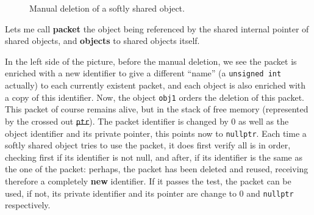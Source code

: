\documentclass{article}
\begin{document}
\begin{figure}[h!]
\begin{center}
  \end{center}

  \caption{Manual deletion of a softly shared object.}
  \label{fig:deletion}
\end{figure}

Lets me call \textbf{packet} the object being referenced by the shared internal
pointer of shared objects, and \textbf{objects} to shared objects itself.

In the left side of the picture, before the manual deletion, we see the packet
is enriched with a new identifier to give a different ``name'' (a
\texttt{unsigned int} actually) to each currently existent packet, and each object
is also enriched with a copy of this identifier. Now, the object \texttt{obj1}
orders the deletion of this packet. This packet of course remains alive, but in
the stack of free memory (represented by the crossed out \texttt{\st{ptr}}). The
packet identifier is changed by 0 as well as the object identifier and its
private pointer, this points now to \texttt{nullptr}. Each time a softly shared
object tries to use the packet, it does first verify all is in order, checking
first if its identifier is not null, and after, if its identifier is the
same as the one of the packet: perhaps, the packet has been deleted and reused,
receiving therefore a completely \textbf{new} identifier. If it passes the test,
the packet can be used, if not, its private identifier and its pointer are
change to 0 and \texttt{nullptr} respectively.
\end{document}
